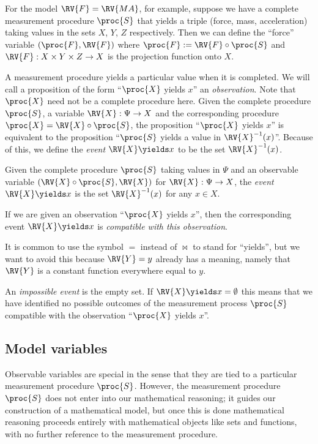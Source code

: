 For the model $\RV{F}=\RV{MA}$, for example, suppose we have a complete measurement procedure $\proc{S}$ that yields a triple (force, mass, acceleration) taking values in the sets $X$, $Y$, $Z$ respectively. Then we can define the ``force'' variable $(\proc{F},\RV{F})$ where $\proc{F}:=\RV{F}\circ \proc{S}$ and $\RV{F}:X\times Y\times Z\to X$ is the projection function onto $X$.

A measurement procedure yields a particular value when it is completed. We will call a proposition of the form ``$\proc{X}$ yields $x$'' an \emph{observation}. Note that $\proc{X}$ need not be a complete procedure here. Given the complete procedure $\proc{S}$, a variable $\RV{X}:\Psi\to X$ and the corresponding procedure $\proc{X}=\RV{X}\circ\proc{S}$, the proposition ``$\proc{X}$ yields $x$'' is equivalent to the proposition ``$\proc{S}$ yields a value in $\RV{X}^{-1}(x)$''. Because of this, we define the \emph{event} $\RV{X}\yields x$ to be the set $\RV{X}^{-1}(x)$.

\begin{definition}[Event]
Given the complete procedure $\proc{S}$ taking values in $\Psi$ and an observable variable $(\RV{X}\circ \proc{S},\RV{X})$ for $\RV{X}:\Psi\to X$, the \emph{event} $\RV{X}\yields x$ is the set $\RV{X}^{-1}(x)$ for any $x\in X$.
\end{definition}

If we are given an observation ``$\proc{X}$ yields $x$'', then the corresponding event $\RV{X}\yields x$ is \emph{compatible with this observation}.

It is common to use the symbol $=$ instead of $\bowtie$ to stand for ``yields'', but we want to avoid this because $\RV{Y}=y$ already has a meaning, namely that $\RV{Y}$ is a constant function everywhere equal to $y$.

An \emph{impossible event} is the empty set. If $\RV{X}\yields x=\emptyset$ this means that we have identified no possible outcomes of the measurement process $\proc{S}$ compatible with the observation ``$\proc{X}$ yields $x$''. 

\subsection{Model variables}

Observable variables are special in the sense that they are tied to a particular measurement procedure $\proc{S}$. However, the measurement procedure $\proc{S}$ does not enter into our mathematical reasoning; it guides our construction of a mathematical model, but once this is done mathematical reasoning proceeds entirely with mathematical objects like sets and functions, with no further reference to the measurement procedure.

